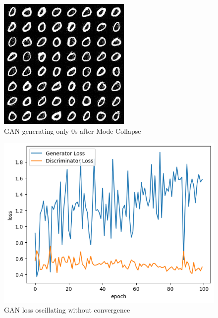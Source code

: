 \documentclass{article}
\begin{document}
\begin{figure}[ht]
\vskip 0.2in
\begin{center}
\centerline{\includegraphics[width=\columnwidth]{images/gan_mode_collapse.png}}
\caption{GAN generating only $0$s after Mode Collapse}
\label{gan-mode-collapse}
\end{center}
\vskip -0.2in
\end{figure}

\begin{figure}[ht]
\vskip 0.2in
\begin{center}
\centerline{\includegraphics[width=\columnwidth]{images/gan_loss.png}}
\caption{GAN loss oscillating without convergence}
\label{gan-loss}
\end{center}
\vskip -0.2in
\end{figure}
\end{document}
